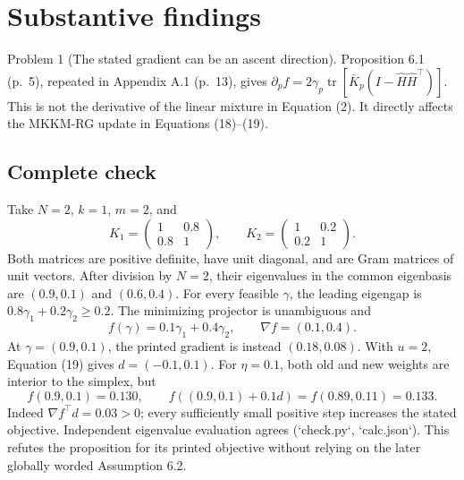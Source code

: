 \documentclass[10pt]{article}
\begin{document}
\section*{Substantive findings}
Problem 1 (The stated gradient can be an ascent direction).  Proposition 6.1 (p. 5), repeated in Appendix A.1 (p. 13), gives \(\partial_pf=2\gamma_p\operatorname{tr}[\bar K_p(I-\widehat H\widehat H^\top)]\). This is not the derivative of the linear mixture in Equation (2). It directly affects the MKKM-RG update in Equations (18)–(19).\par
\subsection*{Complete check}
Take \(N=2\), \(k=1\), \(m=2\), and \[K_1=\begin{pmatrix}1&0.8\\0.8&1\end{pmatrix},\qquad
 K_2=\begin{pmatrix}1&0.2\\0.2&1\end{pmatrix}.\] Both matrices are positive definite, have unit diagonal, and are Gram matrices of unit vectors. After division by \(N=2\), their eigenvalues in the common eigenbasis are \((0.9,0.1)\) and \((0.6,0.4)\). For every feasible \(\gamma\), the leading eigengap is \(0.8\gamma_1+0.2\gamma_2\geq0.2\). The minimizing projector is unambiguous and \[f(\gamma)=0.1\gamma_1+0.4\gamma_2,\qquad \nabla f=(0.1,0.4).\] At \(\gamma=(0.9,0.1)\), the printed gradient is instead \((0.18,0.08)\). With \(u=2\), Equation (19) gives \(d=(-0.1,0.1)\). For \(\eta=0.1\), both old and new weights are interior to the simplex, but \[f(0.9,0.1)=0.130,\qquad
 f((0.9,0.1)+0.1d)=f(0.89,0.11)=0.133.\] Indeed \(\nabla f^\top d=0.03>0\); every sufficiently small positive step increases the stated objective. Independent eigenvalue evaluation agrees (`check.py`, `calc.json`). This refutes the proposition for its printed objective without relying on the later globally worded Assumption 6.2.\par
\end{document}
